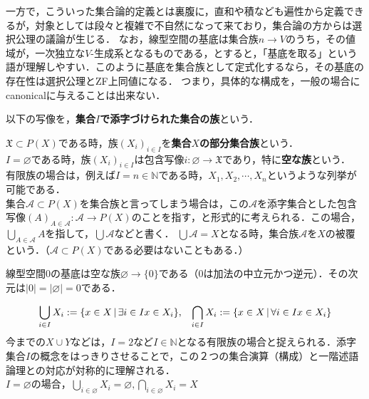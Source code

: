 \documentclass[uplatex, 12pt, dvipdfmx]{jsreport}
\begin{document}
一方で，こういった集合論的定義とは裏腹に，直和や積なども遍性から定義できるが，対象としては段々と複雑で不自然になって来ており，集合論の方からは選択公理の議論が生じる．
なお，線型空間の基底は集合族$n\to V$のうち，その値域が，一次独立な$V$-生成系となるものである，とすると，「基底を取る」という語が理解しやすい．このように基底を集合族として定式化するなら，その基底の存在性は選択公理とZF上同値になる．
つまり，具体的な構成を，一般の場合にcanonicalに与えることは出来ない．

\begin{definition}[集合族]
    以下の写像を，\textbf{集合$I$で添字づけられた集合の族}という．
    \begin{center}\end{center}
    $\mathfrak{X}\subset P(X)$である時，族$(X_i)_{i\in I}$を\textbf{集合$X$の部分集合族}という．\\
    $I=\varnothing$である時，族$(X_i)_{i\in I}$は包含写像$i:\varnothing\to\mathfrak{X}$であり，特に\textbf{空な族}という．\\
    有限族の場合は，例えば$I=n\in\mathbb{N}$である時，$X_1,X_2,\cdots,X_n$というような列挙が可能である．\\
    集合$\mathcal{A}\subset P(X)$を集合族と言ってしまう場合は，この$\mathcal{A}$を添字集合とした包含写像$(A)_{A\in\mathcal{A}}:\mathcal{A}\to P(X)$のことを指す，と形式的に考えられる．この場合，$\bigcup_{A\in\mathcal{A}}A$を指して，$\bigcup\mathcal{A}$などと書く．
    $\bigcup\mathcal{A}=X$となる時，集合族$\mathcal{A}$を$X$の被覆という．（$\mathcal{A}\subset P(X)$である必要はないこともある．）
\end{definition}
\begin{remark}
    線型空間$0$の基底は空な族$\varnothing\to\{ 0\}$である（$0$は加法の中立元かつ逆元）．その次元は$|0|=|\varnothing |=0$である．
\end{remark}
\begin{definition}
    $$\bigcup_{i\in I}X_i:=\{ x\in X\, |\, \exists i\in I x\in X_i \},\hspace{3mm}\bigcap_{i\in I}X_i:=\{ x\in X\, |\, \forall i\in I x\in X_i \}$$
    今までの$X\cup Y$などは，$I=2$など$I\in\mathbb{N}$となる有限族の場合と捉えられる．添字集合$I$の概念をはっきりさせることで，この２つの集合演算（構成）と一階述語論理との対応が対称的に理解される．\\
    $I=\varnothing$の場合，$\bigcup_{i\in\varnothing} X_i=\varnothing ,\bigcap_{i\in\varnothing} X_i=X$
\end{definition}
\end{document}
